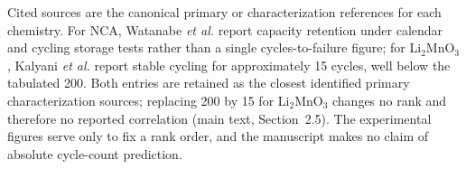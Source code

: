 \documentclass[10pt]{article}
\begin{document}
\begin{table}[htbp]
\vspace{0.5em}
\noindent\footnotesize
Cited sources are the canonical primary or characterization references for each chemistry. For NCA, Watanabe \textit{et al.} report capacity retention under calendar and cycling storage tests rather than a single cycles-to-failure figure; for Li$_2$MnO$_3$, Kalyani \textit{et al.} report stable cycling for approximately 15 cycles, well below the tabulated 200. Both entries are retained as the closest identified primary characterization sources; replacing 200 by 15 for Li$_2$MnO$_3$ changes no rank and therefore no reported correlation (main text, Section~2.5). The experimental figures serve only to fix a rank order, and the manuscript makes no claim of absolute cycle-count prediction.
\normalsize
\end{table}
\end{document}
